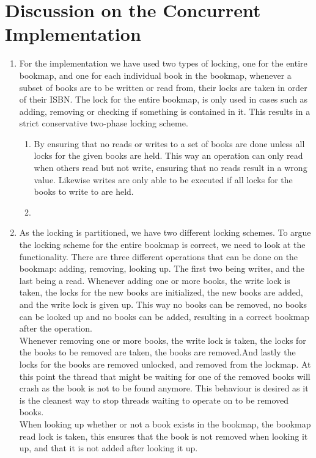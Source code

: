 \documentclass[a4paper]{article}
\begin{document}
\section{Discussion on the Concurrent Implementation}
\begin{enumerate}
  \item For the implementation we have used two types of locking, one for the entire bookmap, and one for each individual book in the bookmap, whenever a subset of books are to be written or read from, their locks are taken in order of their ISBN. The lock for the entire bookmap, is only used in cases such as adding, removing or checking if something is contained in it. This results in a strict conservative two-phase locking scheme.
    \begin{enumerate}
      \item By ensuring that no reads or writes to a set of books are done unless all locks for the given books are held. This way an operation can only read when others read but not write, ensuring that no reads result in a wrong value. Likewise writes are only able to be executed if all locks for the books to write to are held.
      \item %
    \end{enumerate}
  \item As the locking is partitioned, we have two different locking schemes. To argue the locking scheme for the entire bookmap is correct, we need to look at the functionality. There are three different operations that can be done on the bookmap: adding, removing, looking up. The first two being writes, and the last being a read. Whenever adding one or more books, the write lock is taken, the locks for the new books are initialized, the new books are added, and the write lock is given up. This way no books can be removed, no books can be looked up and no books can be added, resulting in a correct bookmap after the operation.\\
Whenever removing one or more books, the write lock is taken, the locks for the books to be removed are taken, the books are removed.And lastly the locks for the books are removed unlocked, and removed from the lockmap. At this point the thread that might be waiting for one of the removed books will crash as the book is not to be found anymore. This behaviour is desired as it is the cleanest way to stop threads waiting to operate on to be removed books.\\
When looking up whether or not a book exists in the bookmap, the bookmap read lock is taken, this ensures that the book is not removed when looking it up, and that it is not added after looking it up.\\

\end{enumerate}
\end{document}
